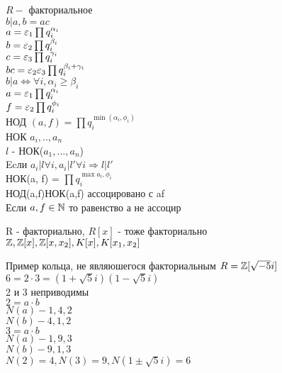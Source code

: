 $ R - $ факториальное \\
$ b | a, b = ac $ \\
$ a = \varepsilon_1 \prod q^{\alpha_i}_{i} $ \\
$ b = \varepsilon_2 \prod q^{\beta_i}_{i} $\\
$ c = \varepsilon_3 \prod q^{\gamma_i}_{i} $ \\
$ bc = \varepsilon_2\varepsilon_3 \prod q_i^{\beta_i + \gamma_i} $\\
$ b | a \Leftrightarrow \forall i, \alpha_i \geq \beta_i $ \\
$ a = \varepsilon_1 \prod q_i^{\alpha_i} $ \\
$ f = \varepsilon_2 \prod q_i^{\phi_i} $ \\
НОД $(a,f) = \prod q_i^{\min(\alpha_i, \phi_i)} $ \\
НОК $ a_i, .., a_n $ \\
$ l $ - НОК($a_1,..., a_n$) \\
Ecли $ a_i | l \forall i, a_i | l' \forall i \Rightarrow l | l' $ \\
НОК(a, f) = $ \prod q_i^{\max a_i, \phi_i} $ \\
НОД(a,f)НОК(a,f) ассоцировано с af \\
Если $ a,f \in \mathbb{N} $ то равенство а не ассоцир \\
\begin{theorem}
	R - факториально, $ R[x] $ - тоже факториально \\
	$ \mathbb{Z}, \mathbb{Z}[x], \mathbb{Z}[x, x_2], K[x], K[x_1, x_2] $
\end{theorem}
Пример кольца, не являюшегося факториальным
$ R = \mathbb{Z}[\sqrt{-5}i] $ \\
$ 6 = 2 \cdot 3 = (1 + \sqrt{5}i)(1 - \sqrt{5}i) $ \\
2 и 3 неприводимы\\
$ 2 = a \cdot b$\\
$ N(a) - 1,4,2 $ \\
$ N(b) - 4,1,2 $ \\
$ 3 = a \cdot b $ \\
$ N(a) - 1,9,3 $ \\
$ N(b) - 9,1,3 $ \\
$ N(2) = 4, N(3) = 9, N(1 \pm \sqrt{5}i)  = 6 $ \\

